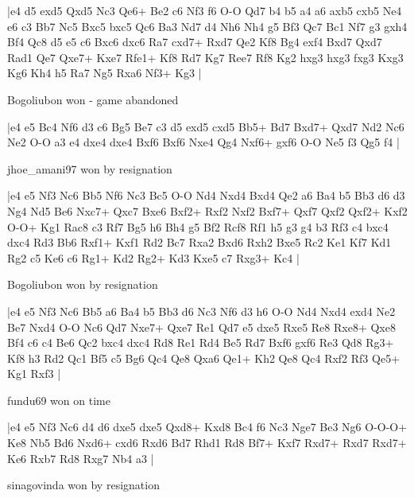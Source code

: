\makegametitle
|e4 d5 exd5 Qxd5 Nc3 Qe6+ Be2 c6 Nf3 f6 O-O Qd7 b4 b5 a4 a6 axb5 cxb5 Ne4 e6 c3 Bb7 Nc5 Bxc5 bxc5 Qc6 Ba3 Nd7 d4 Nh6 Nh4 g5 Bf3 Qc7 Bc1 Nf7 g3 gxh4 Bf4 Qc8 d5 e5 c6 Bxc6 dxc6 Ra7 cxd7+ Rxd7 Qe2 Kf8 Bg4 exf4 Bxd7 Qxd7 Rad1 Qe7 Qxe7+ Kxe7 Rfe1+ Kf8 Rd7 Kg7 Ree7 Rf8 Kg2 hxg3 hxg3 fxg3 Kxg3 Kg6 Kh4 h5 Ra7 Ng5 Rxa6 Nf3+ Kg3  |

\showboard

Bogoliubon won - game abandoned

\makegametitle
|e4 e5 Bc4 Nf6 d3 c6 Bg5 Be7 c3 d5 exd5 cxd5 Bb5+ Bd7 Bxd7+ Qxd7 Nd2 Nc6 Ne2 O-O a3 e4 dxe4 dxe4 Bxf6 Bxf6 Nxe4 Qg4 Nxf6+ gxf6 O-O Ne5 f3 Qg5 f4  |

\showboard

jhoe\_amani97 won by resignation

\makegametitle
|e4 e5 Nf3 Nc6 Bb5 Nf6 Nc3 Bc5 O-O Nd4 Nxd4 Bxd4 Qe2 a6 Ba4 b5 Bb3 d6 d3 Ng4 Nd5 Be6 Nxc7+ Qxc7 Bxe6 Bxf2+ Rxf2 Nxf2 Bxf7+ Qxf7 Qxf2 Qxf2+ Kxf2 O-O+ Kg1 Rac8 c3 Rf7 Bg5 h6 Bh4 g5 Bf2 Rcf8 Rf1 h5 g3 g4 b3 Rf3 c4 bxc4 dxc4 Rd3 Bb6 Rxf1+ Kxf1 Rd2 Bc7 Rxa2 Bxd6 Rxh2 Bxe5 Rc2 Ke1 Kf7 Kd1 Rg2 c5 Ke6 c6 Rg1+ Kd2 Rg2+ Kd3 Kxe5 c7 Rxg3+ Kc4  |

\showboard

Bogoliubon won by resignation

\makegametitle
|e4 e5 Nf3 Nc6 Bb5 a6 Ba4 b5 Bb3 d6 Nc3 Nf6 d3 h6 O-O Nd4 Nxd4 exd4 Ne2 Be7 Nxd4 O-O Nc6 Qd7 Nxe7+ Qxe7 Re1 Qd7 e5 dxe5 Rxe5 Re8 Rxe8+ Qxe8 Bf4 c6 c4 Be6 Qc2 bxc4 dxc4 Rd8 Re1 Rd4 Be5 Rd7 Bxf6 gxf6 Re3 Qd8 Rg3+ Kf8 h3 Rd2 Qc1 Bf5 c5 Bg6 Qc4 Qe8 Qxa6 Qe1+ Kh2 Qe8 Qc4 Rxf2 Rf3 Qe5+ Kg1 Rxf3  |

\showboard

fundu69 won on time

\makegametitle
|e4 e5 Nf3 Nc6 d4 d6 dxe5 dxe5 Qxd8+ Kxd8 Bc4 f6 Nc3 Nge7 Be3 Ng6 O-O-O+ Ke8 Nb5 Bd6 Nxd6+ cxd6 Rxd6 Bd7 Rhd1 Rd8 Bf7+ Kxf7 Rxd7+ Rxd7 Rxd7+ Ke6 Rxb7 Rd8 Rxg7 Nb4 a3  |

\showboard

sinagovinda won by resignation

